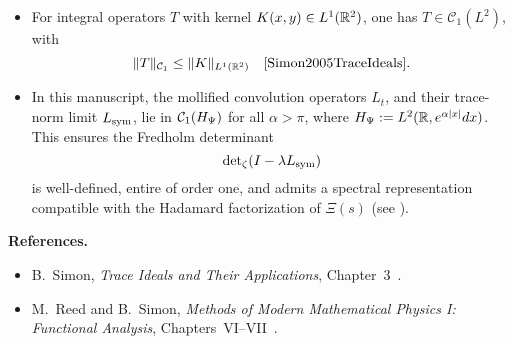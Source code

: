 \begin{definition}
\begin{itemize}
    \item For integral operators \( T \) with kernel \( K(x, y) \in L^1(\mathbb{R}^2) \), one has \( T \in \mathcal{C}_1(L^2) \), with
    \[
    \| T \|_{\mathcal{C}_1} \le \| K \|_{L^1(\R^2)} \quad \text{\cite[Thm.~4.2]{Simon2005TraceIdeals}}.
    \]

    \item In this manuscript, the mollified convolution operators \( L_t \), and their trace-norm limit \( L_{\mathrm{sym}} \), lie in \( \mathcal{C}_1(H_{\Psi}) \) for all \( \alpha > \pi \), where \( H_{\Psi} := L^2(\mathbb{R}, e^{\alpha |x|} dx) \). This ensures the Fredholm determinant
    \[
    \det\nolimits_{\zeta}(I - \lambda L_{\mathrm{sym}})
    \]
    is well-defined, entire of order one, and admits a spectral representation compatible with the Hadamard factorization of \( \Xi(s) \) (see ).
\end{itemize}

\medskip
\noindent\textbf{References.}
\begin{itemize}
    \item B.~Simon, \emph{Trace Ideals and Their Applications}, Chapter~3~\cite{Simon2005TraceIdeals}.
    \item M.~Reed and B.~Simon, \emph{Methods of Modern Mathematical Physics I: Functional Analysis}, Chapters~VI--VII~\cite{ReedSimon1980I}.
\end{itemize}
\end{definition}
